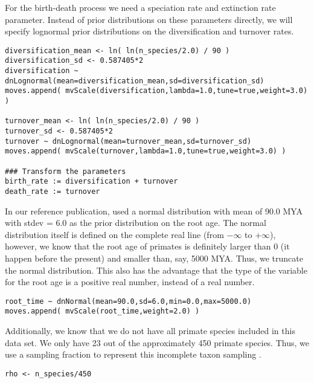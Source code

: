 For the birth-death process we need a speciation rate and extinction rate parameter.
Instead of prior distributions on these parameters directly, we will specify lognormal prior distributions on the diversification and turnover rates.
{\tt \begin{snugshade*}
\begin{lstlisting}
diversification_mean <- ln( ln(n_species/2.0) / 90 )
diversification_sd <- 0.587405*2
diversification ~ dnLognormal(mean=diversification_mean,sd=diversification_sd) 
moves.append( mvScale(diversification,lambda=1.0,tune=true,weight=3.0) )

turnover_mean <- ln( ln(n_species/2.0) / 90 )
turnover_sd <- 0.587405*2
turnover ~ dnLognormal(mean=turnover_mean,sd=turnover_sd) 
moves.append( mvScale(turnover,lambda=1.0,tune=true,weight=3.0) )

### Transform the parameters
birth_rate := diversification + turnover
death_rate := turnover
\end{lstlisting}
\end{snugshade*}}

In our reference publication, \cite{Perelman2011} used a normal distribution with mean of 90.0 MYA with stdev = 6.0 as the prior distribution on the root age.
The normal distribution itself is defined on the complete real line (\IE from $-\infty$ to $+\infty$), however, we know that the root age of primates is definitely larger than 0 (it happen before the present) and smaller than, say, 5000 MYA.
Thus, we truncate the normal distribution.
This also has the advantage that the type of the variable for the root age is a positive real number, instead of a real number.
{\tt \begin{snugshade*}
\begin{lstlisting}
root_time ~ dnNormal(mean=90.0,sd=6.0,min=0.0,max=5000.0)
moves.append( mvScale(root_time,weight=2.0) )
\end{lstlisting}
\end{snugshade*}}

Additionally, we know that we do not have all primate species included in this data set.
We only have 23 out of the approximately 450 primate species.
Thus, we use a sampling fraction to represent this incomplete taxon sampling \citep{Hoehna2011,Hoehna2014a}.
{\tt \begin{snugshade*}
\begin{lstlisting}
rho <- n_species/450
\end{lstlisting}
\end{snugshade*}}


